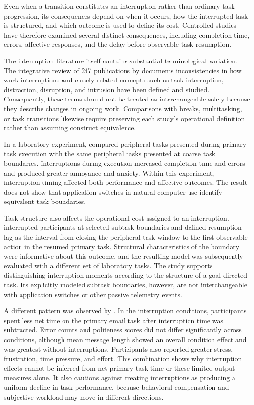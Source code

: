 Even when a transition constitutes an interruption rather than ordinary task progression, its consequences depend on when it occurs, how the interrupted task is structured, and which outcome is used to define its cost. Controlled studies have therefore examined several distinct consequences, including completion time, errors, affective responses, and the delay before observable task resumption.

The interruption literature itself contains substantial terminological variation. The integrative review of 247 publications by \textcite{puranik2020interruptionReview} documents inconsistencies in how work interruptions and closely related concepts such as task interruption, distraction, disruption, and intrusion have been defined and studied. Consequently, these terms should not be treated as interchangeable solely because they describe changes in ongoing work. Comparisons with breaks, multitasking, or task transitions likewise require preserving each study's operational definition rather than assuming construct equivalence.

In a laboratory experiment, \textcite{bailey2006attention} compared peripheral tasks presented during primary-task execution with the same peripheral tasks presented at coarse task boundaries. Interruptions during execution increased completion time and errors and produced greater annoyance and anxiety. Within this experiment, interruption timing affected both performance and affective outcomes. The result does not show that application switches in natural computer use identify equivalent task boundaries.

Task structure also affects the operational cost assigned to an interruption. \textcite{iqbal2006interruptionCost} interrupted participants at selected subtask boundaries and defined resumption lag as the interval from closing the peripheral-task window to the first observable action in the resumed primary task. Structural characteristics of the boundary were informative about this outcome, and the resulting model was subsequently evaluated with a different set of laboratory tasks. The study supports distinguishing interruption moments according to the structure of a goal-directed task. Its explicitly modeled subtask boundaries, however, are not interchangeable with application switches or other passive telemetry events.

A different pattern was observed by \textcite{mark2008cost}. In the interruption conditions, participants spent less net time on the primary email task after interruption time was subtracted. Error counts and politeness scores did not differ significantly across conditions, although mean message length showed an overall condition effect and was greatest without interruptions. Participants also reported greater stress, frustration, time pressure, and effort. This combination shows why interruption effects cannot be inferred from net primary-task time or these limited output measures alone. It also cautions against treating interruptions as producing a uniform decline in task performance, because behavioral compensation and subjective workload may move in different directions.

